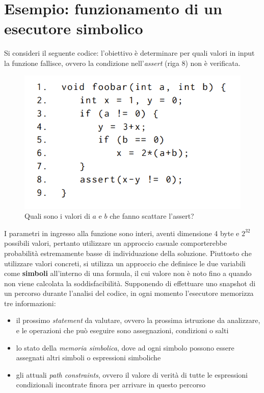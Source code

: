 \documentclass[Lau, oneside]{sapthesis}%
\begin{document}
\section{Esempio: funzionamento di un esecutore simbolico}
Si consideri il seguente codice: l'obiettivo è determinare per quali valori in input la funzione fallisce, ovvero la condizione nell'\textit{assert}
(riga 8) non è verificata.
\newline
\begin{figure}[h]
\centering
\includegraphics[scale=0.3]{foto/esempio_symbolic.png}
\caption{Quali sono i valori di $a$ e $b$ che fanno scattare l'assert? \cite{ref:survey}}
\label{fig:esempio_1}
\end{figure}
\newline
I parametri in ingresso alla funzione sono interi, aventi dimensione 4 byte e $2^{32}$ possibili valori, pertanto utilizzare un approccio casuale comporterebbe probabilità estremamente basse di individuazione della soluzione.
\newline
Piuttosto che utilizzare valori concreti, si utilizza un approccio che definisce le due variabili come \textbf{simboli} all'interno di una formula, il cui valore non è noto fino a quando non viene calcolata la soddisfacibilità.
\newline \newline
Supponendo di effettuare uno snapshot di un percorso durante l'analisi del codice, in ogni momento l'esecutore memorizza tre informazioni:
\begin{itemize}
    \item il prossimo \textit{statement} da valutare, ovvero la prossima istruzione da analizzare, e le operazioni che può eseguire sono assegnazioni, condizioni o salti
    \item lo stato della \textit{memoria simbolica}, dove ad ogni simbolo possono essere assegnati altri simboli o espressioni simboliche
    \item gli attuali \textit{path constraints}, ovvero il valore di verità di tutte le espressioni condizionali incontrate finora per arrivare in questo percorso
\end{itemize}
\end{document}
